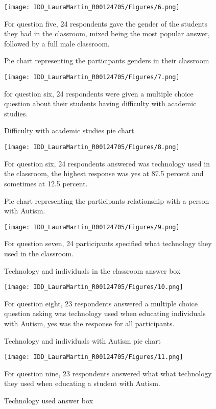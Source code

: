 \begin{figure}[ht]
\centering
\texttt{[image: IDD\_LauraMartin\_R00124705/Figures/6.png]}
\caption{Pie chart representing the participants genders in their classroom}
{For question five, 24 respondents gave the gender of the students they had in the classroom, mixed being the most popular answer, followed by a full male classroom.}
\end{figure}

\begin{figure}[ht]
\centering
\texttt{[image: IDD\_LauraMartin\_R00124705/Figures/7.png]}
\caption{Difficulty with academic studies pie chart}
{for question six, 24 respondents were given a multiple choice question about their students having difficulty with academic studies.}
\end{figure}

\begin{figure}[ht]
\centering
\texttt{[image: IDD\_LauraMartin\_R00124705/Figures/8.png]}
\caption{Pie chart representing the participants relationship with a person with Autism.}
{For question six, 24 respondents answered was technology used in the classroom, the highest response was yes at 87.5 percent and sometimes at 12.5 percent.}

\end{figure}

\begin{figure}[ht]
\centering
\texttt{[image: IDD\_LauraMartin\_R00124705/Figures/9.png]}
\caption{Technology and individuals in the classroom answer box}
{For question seven, 24 participants specified what technology they used in the classroom.}

\end{figure}

\begin{figure}[ht]
\centering
\texttt{[image: IDD\_LauraMartin\_R00124705/Figures/10.png]}
\caption{Technology and individuals with Autism pie chart}
{For question eight, 23 respondents answered a multiple choice question asking was technology used when educating individuals with Autism, yes was the response for all participants.}
\end{figure}

\begin{figure}[ht]
\centering
\texttt{[image: IDD\_LauraMartin\_R00124705/Figures/11.png]}
\caption{Technology used answer box}
{For question nine, 23 respondents answered what what technology they used when educating a student with Autism.}
\end{figure}

